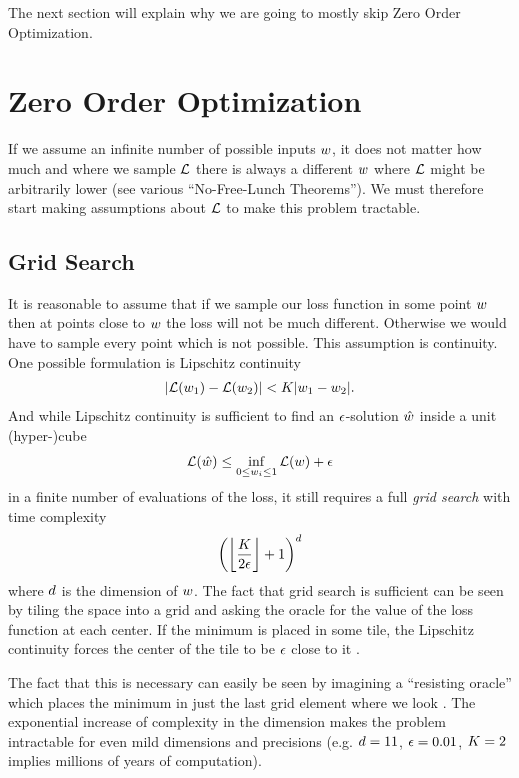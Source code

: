 The next section will explain why we are going to mostly skip Zero Order
Optimization.

\section{Zero Order Optimization}

If we assume an infinite number of possible inputs \(w\), it does not matter
how much and where we sample \(\mathcal{L}\) there is always a different \(w\) where
\(\mathcal{L}\) might be arbitrarily lower (see various ``No-Free-Lunch Theorems'').
We must therefore start making assumptions about \(\mathcal{L}\) to make this
problem tractable.

\subsection{Grid Search}

It is reasonable to assume that if we sample our loss function in some point \(w\)
then at points close to \(w\) the loss will not be much different. Otherwise
we would have to sample every point which is not possible. This assumption is
continuity. One possible formulation is Lipschitz continuity
%
\begin{align*}
	| \mathcal{L}(w_1) - \mathcal{L}(w_2) | < K | w_1 - w_2 |.
\end{align*}
%
And while Lipschitz continuity is sufficient to find an \(\epsilon\)-solution
\(\hat{w}\) inside a unit (hyper-)cube
%
\begin{align*}
	\mathcal{L}(\hat{w}) \le \inf_{ 0\le w_i\le 1} \mathcal{L}(w) + \epsilon
\end{align*}
%
in a finite number of evaluations of the loss, it still requires a full
\emph{grid search} with time complexity
%
\begin{align*}
	\left(\left\lfloor \frac{K}{2\epsilon}\right\rfloor + 1\right)^d
\end{align*}
%
where \(d\) is the dimension of \(w\). The fact that grid search is
sufficient can be seen by tiling the space into a grid and asking the oracle
for the value of the loss function at each center. If the minimum is placed in
some tile, the Lipschitz continuity forces the center of the tile to be \(\epsilon\)
close to it \parencite[cf.][p. 11]{nesterovLecturesConvexOptimization2018}.

The fact that this is necessary can easily be seen by imagining a ``resisting
oracle'' which places the minimum in just the last grid element where we look
\parencite[cf.][p. 13]{nesterovLecturesConvexOptimization2018}. The exponential
increase of complexity in the dimension makes the problem intractable for even
mild dimensions and precisions (e.g. \(d=11\), \(\epsilon=0.01\), \(K=2\)
implies millions of years of computation).

